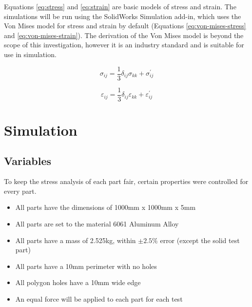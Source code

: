 \documentclass[12pt, letterpaper]{article}
\begin{document}
Equations \ref{eq:stress} and \ref{eq:strain} are basic models of stress and strain. The simulations will be run using the SolidWorks Simulation add-in, which uses the Von Mises model for stress and strain by default (Equations \ref{eq:von-mises-stress} and \ref{eq:von-mises-strain}). The derivation of the Von Mises model is beyond the scope of this investigation, however it is an industry standard and is suitable for use in simulation. 

\begin{equation}
	\label{eq:von-mises-stress}
	\sigma_{ij} = \frac{1}{3} \delta_{ij} \sigma_{kk} + \sigma^\prime_{ij}
\end{equation}

\begin{equation}
	\label{eq:von-mises-strain}
	\varepsilon_{ij} = \frac{1}{3} \delta_{ij} \varepsilon_{kk} + \varepsilon^\prime_{ij}
\end{equation}

\section{Simulation}
\label{sec:simulation}

\subsection{Variables}
\label{sec:variables}

To keep the stress analysis of each part fair, certain properties were controlled for every part. 

\begin{itemize}
\item All parts have the dimensions of 1000mm x 1000mm x 5mm
\item All parts are set to the material 6061 Aluminum Alloy
\item All parts have a mass of 2.525kg, within $\pm2.5\%$ error (except the solid test part)
\item All parts have a 10mm perimeter with no holes
\item All polygon holes have a 10mm wide edge
\item An equal force will be applied to each part for each test
\end{itemize}
\end{document}
